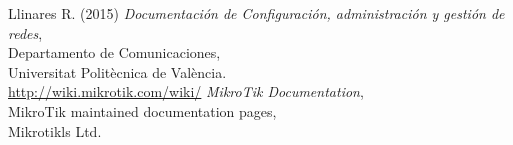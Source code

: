 
\thispagestyle{empty}
\begin{thebibliography}{2}
	
	Llinares R. (2015) 
	\emph{Documentación de Configuración, administración y gestión de redes},\\
	Departamento de Comunicaciones,\\
	Universitat Politècnica de València.\\
	
	
	\url{http://wiki.mikrotik.com/wiki/}
	\emph{MikroTik Documentation},\\
	MikroTik maintained documentation pages,\\
	Mikrotikls Ltd.\\
\end{thebibliography}

